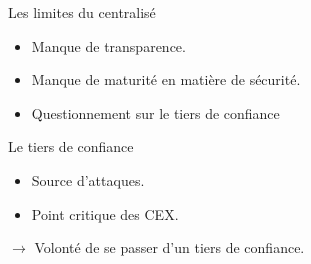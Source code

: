 \begin{frame}{Les limites du centralisé}
    \begin{itemize}
        \item Manque de transparence.
        \item Manque de maturité en matière de sécurité.
        \item Questionnement sur le tiers de confiance
    \end{itemize}
    \pause
    \begin{block}{Le tiers de confiance}
        \begin{itemize}
            \item Source d'attaques.
            \item Point critique des CEX.
        \end{itemize}
        $\rightarrow$ Volonté de se passer d'un tiers de confiance.
    \end{block}
\end{frame}